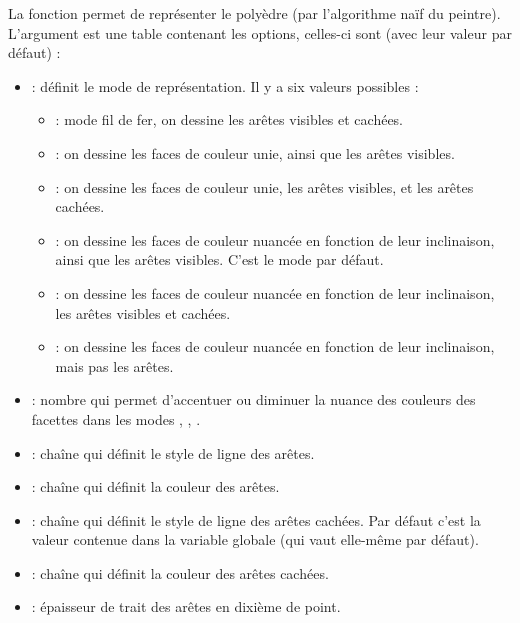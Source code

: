 La fonction  permet de représenter le polyèdre  (par l'algorithme naïf du peintre). L'argument  est une table contenant les options, celles-ci sont (avec leur valeur par défaut) :
\begin{itemize}
    \item {} : définit le mode de représentation. Il y a six valeurs possibles :
        \begin{itemize}
            \item {} : mode fil de fer, on dessine les arêtes visibles et cachées.
            \item {} : on dessine les faces de couleur unie, ainsi que les arêtes visibles.
            \item {} : on dessine les faces de couleur unie, les arêtes visibles, et les arêtes cachées.
            \item {} : on dessine les faces de couleur nuancée en fonction de leur inclinaison, ainsi que les arêtes visibles. C'est le mode par défaut.
            \item {} : on dessine les faces de couleur nuancée en fonction de leur inclinaison, les arêtes visibles et cachées.
            \item {} :  on dessine les faces de couleur nuancée en fonction de leur inclinaison, mais pas les arêtes.
        \end{itemize}
        \item {} : nombre qui permet d'accentuer ou diminuer la nuance des couleurs des facettes dans les modes , , .
        \item {} : chaîne qui définit le style de ligne des arêtes.
        \item {} : chaîne qui définit la couleur des arêtes.
        \item {} : chaîne qui définit le style de ligne des arêtes cachées. Par défaut c'est la valeur contenue dans la variable globale  (qui vaut elle-même  par défaut).
        \item {} : chaîne qui définit la couleur des arêtes cachées. 
        \item {} : épaisseur de trait des arêtes en dixième de point. 

\end{itemize}
